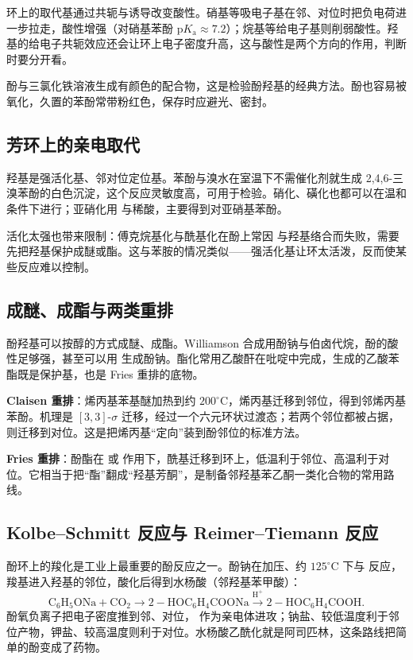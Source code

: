 \documentclass[UTF8]{ctexbook}
\begin{document}
环上的取代基通过共轭与诱导改变酸性。硝基等吸电子基在邻、对位时把负电荷进一步拉走，酸性增强（对硝基苯酚 $\mathrm{p}K_{\mathrm{a}}\approx7.2$）；烷基等给电子基则削弱酸性。羟基的给电子共轭效应还会让环上电子密度升高，这与酸性是两个方向的作用，判断时要分开看。

酚与三氯化铁溶液生成有颜色的配合物，这是检验酚羟基的经典方法。酚也容易被氧化，久置的苯酚常带粉红色，保存时应避光、密封。

\subsection{芳环上的亲电取代}

羟基是强活化基、邻对位定位基。苯酚与溴水在室温下不需催化剂就生成 2,4,6-三溴苯酚的白色沉淀，这个反应灵敏度高，可用于检验。硝化、磺化也都可以在温和条件下进行；亚硝化用  与稀酸，主要得到对亚硝基苯酚。

活化太强也带来限制：傅克烷基化与酰基化在酚上常因  与羟基络合而失败，需要先把羟基保护成醚或酯。这与苯胺的情况类似——强活化基让环太活泼，反而使某些反应难以控制。

\subsection{成醚、成酯与两类重排}

酚羟基可以按醇的方式成醚、成酯。Williamson 合成用酚钠与伯卤代烷，酚的酸性足够强，甚至可以用  生成酚钠。酯化常用乙酸酐在吡啶中完成，生成的乙酸苯酯既是保护基，也是 Fries 重排的底物。

\textbf{Claisen 重排}：烯丙基苯基醚加热到约 $200^\circ\mathrm{C}$，烯丙基迁移到邻位，得到邻烯丙基苯酚。机理是 $[3,3]$-$\sigma$ 迁移，经过一个六元环状过渡态；若两个邻位都被占据，则迁移到对位。这是把烯丙基“定向”装到酚邻位的标准方法。

\textbf{Fries 重排}：酚酯在  或  作用下，酰基迁移到环上，低温利于邻位、高温利于对位。它相当于把“酯”翻成“羟基芳酮”，是制备邻羟基苯乙酮一类化合物的常用路线。

\subsection{Kolbe--Schmitt 反应与 Reimer--Tiemann 反应}

酚环上的羧化是工业上最重要的酚反应之一。酚钠在加压、约 $125^\circ\mathrm{C}$ 下与  反应，羧基进入羟基的邻位，酸化后得到水杨酸（邻羟基苯甲酸）：
\[
\mathrm{C_6H_5ONa}+\mathrm{CO_2}\longrightarrow
\mathrm{2-HOC_6H_4COONa}\xrightarrow{\mathrm{H^+}}
\mathrm{2-HOC_6H_4COOH}.
\]
酚氧负离子把电子密度推到邻、对位， 作为亲电体进攻；钠盐、较低温度利于邻位产物，钾盐、较高温度则利于对位。水杨酸乙酰化就是阿司匹林，这条路线把简单的酚变成了药物。
\end{document}
